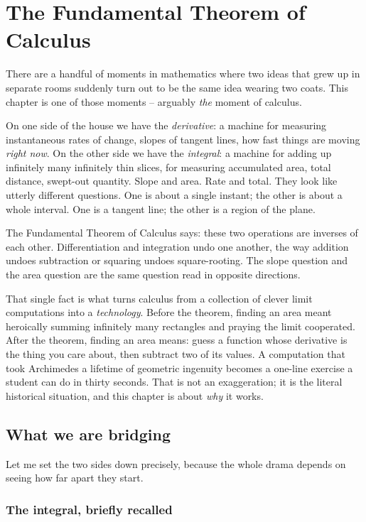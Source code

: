 \chapter{The Fundamental Theorem of Calculus}

There are a handful of moments in mathematics where two ideas that grew up in
separate rooms suddenly turn out to be the same idea wearing two coats. This
chapter is one of those moments -- arguably \emph{the} moment of calculus.

On one side of the house we have the \emph{derivative}: a machine for measuring
instantaneous rates of change, slopes of tangent lines, how fast things are
moving \emph{right now}. On the other side we have the \emph{integral}: a
machine for adding up infinitely many infinitely thin slices, for measuring
accumulated area, total distance, swept-out quantity. Slope and area. Rate and
total. They look like utterly different questions. One is about a single instant;
the other is about a whole interval. One is a tangent line; the other is a region
of the plane.

The Fundamental Theorem of Calculus says: these two operations are inverses of
each other. Differentiation and integration undo one another, the way addition
undoes subtraction or squaring undoes square-rooting. The slope question and the
area question are the same question read in opposite directions.

That single fact is what turns calculus from a collection of clever limit
computations into a \emph{technology}. Before the theorem, finding an area meant
heroically summing infinitely many rectangles and praying the limit cooperated.
After the theorem, finding an area means: guess a function whose derivative is
the thing you care about, then subtract two of its values. A computation that
took Archimedes a lifetime of geometric ingenuity becomes a one-line exercise a
student can do in thirty seconds. That is not an exaggeration; it is the literal
historical situation, and this chapter is about \emph{why} it works.

\section{What we are bridging}

Let me set the two sides down precisely, because the whole drama depends on
seeing how far apart they start.

\subsection{The integral, briefly recalled}

